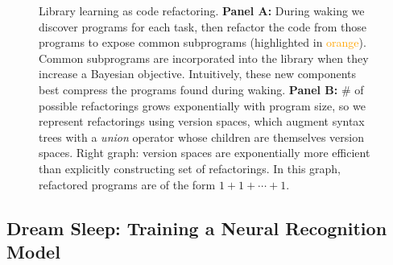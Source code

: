 \documentclass{article}
\newcommand{\code}[1]{{\footnotesize\texttt{#1}}}
\newcommand{\orange}[1]{\textcolor{orange}{#1}}
\begin{document}
\begin{figure}
  \caption{Library learning as code refactoring. \textbf{Panel A:} During waking we discover programs for each task, then refactor the code from those programs to expose common subprograms (highlighted in \orange{orange}). Common subprograms are incorporated into the library when they increase a Bayesian objective. Intuitively, these new components best compress the programs found during waking. \textbf{Panel B:} \# of possible refactorings grows exponentially with program size, so we represent refactorings using version spaces, which augment syntax trees with a \emph{union} operator whose children are themselves version spaces. Right graph: version spaces are exponentially more efficient than explicitly constructing set of refactorings. In this graph, refactored programs are of the form $1+1+\cdots  + 1$.}\label{mapFactor}
\end{figure}


\subsection{Dream Sleep: Training a Neural Recognition Model}\label{recognitionSection}
\end{document}
